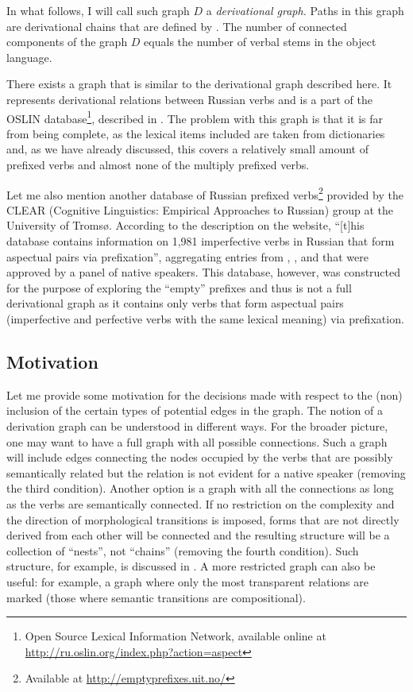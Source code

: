 In what follows, I will call such graph $D$ a \textit{derivational graph.} Paths in this graph are derivational chains that are defined by . The number of connected components of the graph $D$ equals the number of verbal stems in the object language.

There exists a graph that is similar to the derivational graph described here. It represents derivational relations between Russian verbs and is a part of the OSLIN database\footnote{Open Source Lexical Information Network, available online at \url{http://ru.oslin.org/index.php?action=aspect}}, described in \cite{Borik:12}. The problem with this graph is that it is far from being complete, as the lexical items included are taken from dictionaries and, as we have already discussed, this covers a relatively small amount of prefixed verbs and almost none of the multiply prefixed verbs.

Let me also mention another database of Russian prefixed verbs\footnote{Available at \url{http://emptyprefixes.uit.no/}} provided by the CLEAR (Cognitive Linguistics: Empirical Approaches to Russian) group at the University of Troms{\o}. According to the description on the website, ``[t]his database contains information on 1,981 imperfective verbs in Russian that form aspectual pairs via prefixation'', aggregating entries from \citet{MAS}, \citet{Ozegov:01},  and \citet{Cubberly:82} that were approved by a panel of native speakers. This database, however, was constructed for the purpose of exploring the ``empty'' prefixes and thus is not a full derivational graph as it contains only verbs that form aspectual pairs (imperfective and perfective verbs with the same lexical meaning) via prefixation.

\subsection{Motivation}\label{section:chains:motivation}
Let me provide some motivation for the decisions made with respect to the (non) inclusion of the certain types of potential edges in the graph. The notion of a derivation graph can be understood in different ways. For the broader picture, one may want to have a full graph with all possible connections. Such a graph will include edges connecting the nodes occupied by the verbs that are possibly semantically related but the relation is not evident for a native speaker (removing the third condition). Another option is a graph with all the connections as long as the verbs are semantically connected. If no restriction on the complexity and the direction of morphological transitions is imposed, forms that are not directly derived from each other will be connected and the resulting structure will be a collection of ``nests'', not ``chains'' (removing the fourth condition). Such structure, for example, is discussed in \citealt{Janda:10}. A more restricted graph can also be useful: for example, a graph where only the most transparent relations are marked (those where semantic transitions are compositional). 

